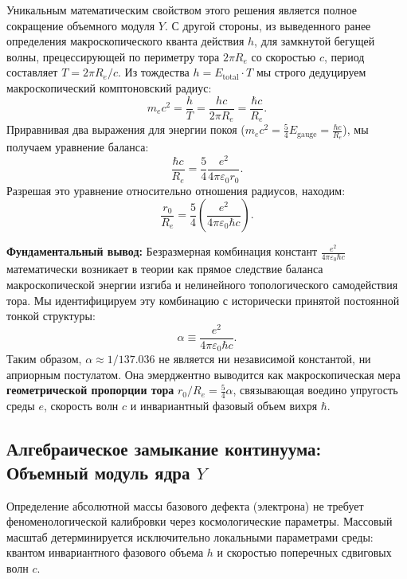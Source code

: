 \documentclass[11pt,a4paper]{article}
\begin{document}
	Уникальным математическим свойством этого решения является полное сокращение объемного модуля $Y$. 
	С другой стороны, из выведенного ранее определения макроскопического кванта действия $h$, для замкнутой бегущей волны, прецессирующей по периметру тора $2\pi R_e$ со скоростью $c$, период составляет $T = 2\pi R_e/c$. Из тождества $h = E_{\text{total}} \cdot T$ мы строго дедуцируем макроскопический комптоновский радиус:
	\begin{equation}
		m_e c^2 = \frac{h}{T} = \frac{h c}{2\pi R_e} = \frac{\hbar c}{R_e}.
	\end{equation}
	Приравнивая два выражения для энергии покоя ($m_e c^2 = \frac{5}{4} E_{\text{gauge}} = \frac{\hbar c}{R_e}$), мы получаем уравнение баланса:
	\begin{equation}
		\frac{\hbar c}{R_e} = \frac{5}{4} \frac{e^2}{4\pi\varepsilon_0 r_0}.
	\end{equation}
	Разрешая это уравнение относительно отношения радиусов, находим:
	\begin{equation}
		\frac{r_0}{R_e} = \frac{5}{4} \left( \frac{e^2}{4\pi\varepsilon_0 \hbar c} \right).
		\label{alpha_derivation}
	\end{equation}
	
	\textbf{Фундаментальный вывод:} Безразмерная комбинация констант $\frac{e^2}{4\pi\varepsilon_0 \hbar c}$ математически возникает в теории как прямое следствие баланса макроскопической энергии изгиба и нелинейного топологического самодействия тора. 
	Мы идентифицируем эту комбинацию с исторически принятой постоянной тонкой структуры:
	\begin{equation}
		\alpha \equiv \frac{e^2}{4\pi\varepsilon_0 \hbar c}.
	\end{equation}
	Таким образом, $\alpha \approx 1/137.036$ не является ни независимой константой, ни априорным постулатом. Она эмерджентно выводится как макроскопическая мера \textbf{геометрической пропорции тора} $r_0/R_e = \frac{5}{4}\alpha$, связывающая воедино упругость среды $e$, скорость волн $c$ и инвариантный фазовый объем вихря $\hbar$.
	
	\subsection{Алгебраическое замыкание континуума: Объемный модуль ядра $Y$}
	Определение абсолютной массы базового дефекта (электрона) не требует феноменологической калибровки через космологические параметры. Массовый масштаб детерминируется исключительно локальными параметрами среды: квантом инвариантного фазового объема $h$ и скоростью поперечных сдвиговых волн $c$.
	
\end{document}
